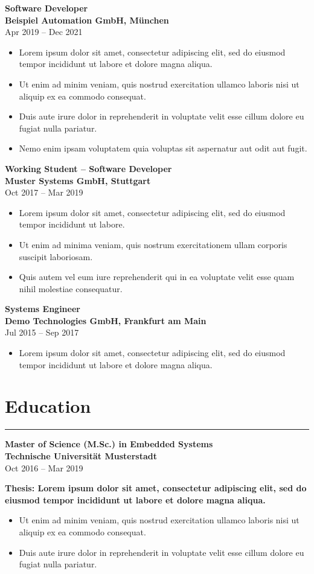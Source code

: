\documentclass[10pt,a4paper]{article}
\newcommand{\cvsection}[1]{%
  \Needspace{4\baselineskip}%
  \section*{#1}%
  \vspace{-0.32em}%
  {\color{cvgray}\rule{\linewidth}{0.35pt}}%
  \vspace{0.12em}%
}
\newcommand{\cventryheader}[3]{%
  \Needspace{5\baselineskip}%
  {\normalsize\textbf{#1}}\\[-0.10em]
  {\normalsize\textbf{#2}}\\[-0.10em]
  {\small\color{cvgray}#3}\par
  \vspace{0.02em}%
}
\begin{document}
\cventryheader{Software Developer}{Beispiel Automation GmbH, München}{Apr 2019 -- Dec 2021}
\begin{itemize}
  \item Lorem ipsum dolor sit amet, consectetur adipiscing elit, sed do eiusmod tempor incididunt ut labore et dolore magna aliqua.
  \item Ut enim ad minim veniam, quis nostrud exercitation ullamco laboris nisi ut aliquip ex ea commodo consequat.
  \item Duis aute irure dolor in reprehenderit in voluptate velit esse cillum dolore eu fugiat nulla pariatur.
  \item Nemo enim ipsam voluptatem quia voluptas sit aspernatur aut odit aut fugit.
\end{itemize}

\cventryheader{Working Student -- Software Developer}{Muster Systems GmbH, Stuttgart}{Oct 2017 -- Mar 2019}
\begin{itemize}
  \item Lorem ipsum dolor sit amet, consectetur adipiscing elit, sed do eiusmod tempor incididunt ut labore.
  \item Ut enim ad minima veniam, quis nostrum exercitationem ullam corporis suscipit laboriosam.
  \item Quis autem vel eum iure reprehenderit qui in ea voluptate velit esse quam nihil molestiae consequatur.
\end{itemize}

\cventryheader{Systems Engineer}{Demo Technologies GmbH, Frankfurt am Main}{Jul 2015 -- Sep 2017}
\begin{itemize}
  \item Lorem ipsum dolor sit amet, consectetur adipiscing elit, sed do eiusmod tempor incididunt ut labore et dolore magna aliqua.
\end{itemize}

\cvsection{Education}

\cventryheader{Master of Science (M.Sc.) in Embedded Systems}{Technische Universität Musterstadt}{Oct 2016 -- Mar 2019}

\textbf{Thesis: Lorem ipsum dolor sit amet, consectetur adipiscing elit, sed do eiusmod tempor incididunt ut labore et dolore magna aliqua.}

\begin{itemize}
  \item Ut enim ad minim veniam, quis nostrud exercitation ullamco laboris nisi ut aliquip ex ea commodo consequat.
  \item Duis aute irure dolor in reprehenderit in voluptate velit esse cillum dolore eu fugiat nulla pariatur.
\end{itemize}
\end{document}
